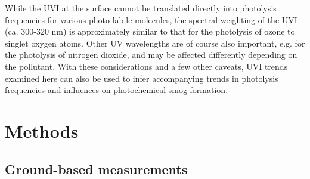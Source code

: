 \documentclass[journal=jacsat,manuscript=article]{achemso}
\begin{document}
While the UVI at the surface cannot be translated directly into
photolysis frequencies for various photo-labile molecules, the spectral
weighting of the UVI (ca. 300-320 nm) is approximately similar to that
for the photolysis of ozone to singlet oxygen atoms. Other UV
wavelengths are of course also important, e.g. for the photolysis of
nitrogen dioxide, and may be affected differently depending on the
pollutant. With these considerations and a few other caveats, UVI trends
examined here can also be used to infer accompanying trends in
photolysis frequencies and influences on photochemical smog formation.




\section{Methods}
\label{sec:methods}

\subsection{Ground-based measurements}
\end{document}
